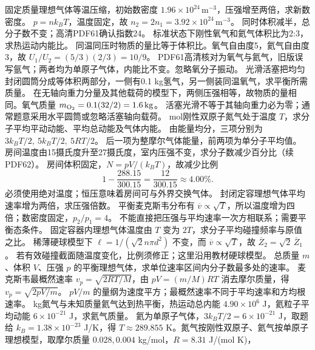 \problemtext 固定质量理想气体等温压缩，初始数密度 $1.96\times10^{24}\,\mathrm{m^{-3}}$，压强增至两倍，求新数密度。
\workings $p=nk_BT$，温度固定，故 $n_2=2n_1=3.92\times10^{24}\,\mathrm{m^{-3}}$。
\crosscheck 同时体积减半，总分子数不变；高清PDF61确认指数24。
\problemtext 标准状态下刚性氧气和氦气体积比为2:3，求热运动内能比。
\workings 同温同压时物质的量比等于体积比。氧气自由度5，氦气自由度3，故 $U_1/U_2=(5/3)(2/3)=10/9$。
\crosscheck PDF61高清核对为氧气与氦气，旧版误写氩气；两者均为单原子气体，内能比不变。忽略氧分子振动。
\problemtext 光滑活塞把均匀封闭圆筒分成等体积两部分，一侧有0.1 kg氢气，另一侧装同温氧气，求平衡所需质量。
\workings 在无轴向重力分量及其他载荷的模型下，两侧压强相等，故物质的量相同。氧气质量 $m_{\rm O_2}=0.1(32/2)=1.6\,\mathrm{kg}$。
\crosscheck 活塞光滑不等于其轴向重力必为零；通常题意采用水平圆筒或忽略活塞轴向载荷。
 mol刚性双原子氮气处于温度 $T$，求分子平均平动动能、平均总动能及气体内能。
\workings 由能量均分，三项分别为 $3k_BT/2,\ 5k_BT/2,\ 5RT/2$。
\crosscheck 后一项为整摩尔气体能量，前两项为单分子平均值。
\problemtext 房间温度由15摄氏度升至27摄氏度，室内压强不变，求分子数减少百分比（续PDF62）。
\workings 房间体积固定，$N=pV/(k_BT)$，故减少比例
\[
1-\frac{288.15}{300.15}=\frac{12}{300.15}\approx4.00\%.
\]
\crosscheck 必须使用绝对温度；恒压意味着房间可与外界交换气体。
\problemtext 封闭定容理想气体平均速率增为两倍，求压强倍数。
\workings 平衡麦克斯韦分布有 $\overline v\propto\sqrt T$，所以温度增为四倍；数密度固定，$p_2/p_1=4$。
\crosscheck 不能直接把压强与平均速率一次方相联系；需要平衡态条件。
\problemtext 固定容器内理想气体温度由 $T$ 变为 $2T$，求分子平均碰撞频率与原值之比。
\workings 稀薄硬球模型下 $\ell=1/(\sqrt2 n\pi d^2)$ 不变，而 $\overline v\propto\sqrt T$，故 $\overline Z_2=\sqrt2\,\overline Z_1$。
\crosscheck 若有效碰撞截面随温度变化，比例须修正；这里沿用教材硬球模型。
\problemtext 总质量 $m$、体积 $V$、压强 $p$ 的平衡理想气体，求单位速率区间内分子数最多处的速率。
\workings 麦克斯韦最概然速率 $v_p=\sqrt{2RT/M}$，由 $pV=(m/M)RT$ 消去摩尔质量，得 $v_p=\sqrt{2pV/m}$。
\crosscheck $pV/m$ 的量纲为速度平方；最概然速率不同于平均速率和方均根速率。
 kg氮气与未知质量氦气达到热平衡，热运动总内能 $4.90\times10^6$ J，氦粒子平均动能 $6\times10^{-21}$ J，求氦气质量。
\workings 氦为单原子气体，$3k_BT/2=6\times10^{-21}$ J，取题给 $k_B=1.38\times10^{-23}$ J/K，得 $T\approx289.855$ K。氮气按刚性双原子、氦气按单原子理想模型，取摩尔质量 $0.028,0.004$ kg/mol，$R=8.31$ J/(mol K)，

